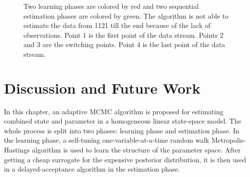 \begin{figure}[h]
	\centering
	\caption{Two learning phases are colored by red and two sequential estimation phases are colored by green. The algorithm is not able to estimate the data from 1121 till the end because of the lack of observations. Point 1 is the first point of the data stream. Points 2 and 3 are the switching points. Point 4 is the last point of the data stream. }\label{MCMCwholeestimation}
\end{figure}



\section{Discussion and Future Work}


In this chapter, an adaptive MCMC algorithm is proposed for estimating combined state and parameter in a homogeneous linear state-space model. The whole process is split into two phases: learning phase and estimation phase. In the learning phase, a self-tuning one-variable-at-a-time random walk Metropolis-Hastings algorithm is used to learn the structure of the parameter space. After getting a cheap surrogate for the expensive posterior distribution, it is then used in a delayed-acceptance algorithm in the estimation phase. 


